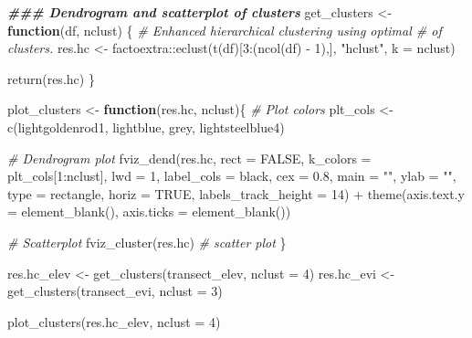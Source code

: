\documentclass[
]{article}
\newenvironment{Shaded}{\begin{snugshade}}{\end{snugshade}}
\newcommand{\AttributeTok}[1]{\textcolor[rgb]{0.77,0.63,0.00}{#1}}
\newcommand{\CommentTok}[1]{\textcolor[rgb]{0.56,0.35,0.01}{\textit{#1}}}
\newcommand{\ConstantTok}[1]{\textcolor[rgb]{0.00,0.00,0.00}{#1}}
\newcommand{\ControlFlowTok}[1]{\textcolor[rgb]{0.13,0.29,0.53}{\textbf{#1}}}
\newcommand{\DecValTok}[1]{\textcolor[rgb]{0.00,0.00,0.81}{#1}}
\newcommand{\DocumentationTok}[1]{\textcolor[rgb]{0.56,0.35,0.01}{\textbf{\textit{#1}}}}
\newcommand{\FloatTok}[1]{\textcolor[rgb]{0.00,0.00,0.81}{#1}}
\newcommand{\FunctionTok}[1]{\textcolor[rgb]{0.00,0.00,0.00}{#1}}
\newcommand{\NormalTok}[1]{#1}
\newcommand{\OtherTok}[1]{\textcolor[rgb]{0.56,0.35,0.01}{#1}}
\newcommand{\SpecialCharTok}[1]{\textcolor[rgb]{0.00,0.00,0.00}{#1}}
\newcommand{\StringTok}[1]{\textcolor[rgb]{0.31,0.60,0.02}{#1}}
\begin{document}
\begin{Shaded}
\begin{Highlighting}[]

\DocumentationTok{\#\#\# Dendrogram and scatterplot of clusters}
\NormalTok{get\_clusters }\OtherTok{\textless{}{-}} \ControlFlowTok{function}\NormalTok{(df, nclust) \{}
  \CommentTok{\# Enhanced hierarchical clustering using optimal \# of clusters.}
\NormalTok{  res.hc }\OtherTok{\textless{}{-}}\NormalTok{ factoextra}\SpecialCharTok{::}\FunctionTok{eclust}\NormalTok{(}\FunctionTok{t}\NormalTok{(df)[}\DecValTok{3}\SpecialCharTok{:}\NormalTok{(}\FunctionTok{ncol}\NormalTok{(df) }\SpecialCharTok{{-}} \DecValTok{1}\NormalTok{),], }
                                 \StringTok{"hclust"}\NormalTok{, }\AttributeTok{k =}\NormalTok{ nclust)}
  
  \FunctionTok{return}\NormalTok{(res.hc)}
\NormalTok{\}}

\NormalTok{plot\_clusters }\OtherTok{\textless{}{-}} \ControlFlowTok{function}\NormalTok{(res.hc, nclust)\{}
  \CommentTok{\# Plot colors}
\NormalTok{  plt\_cols }\OtherTok{\textless{}{-}} \FunctionTok{c}\NormalTok{(}\StringTok{\textquotesingle{}lightgoldenrod1\textquotesingle{}}\NormalTok{, }\StringTok{\textquotesingle{}lightblue\textquotesingle{}}\NormalTok{, }\StringTok{\textquotesingle{}grey\textquotesingle{}}\NormalTok{, }\StringTok{\textquotesingle{}lightsteelblue4\textquotesingle{}}\NormalTok{)}
  
  \CommentTok{\# Dendrogram plot}
  \FunctionTok{fviz\_dend}\NormalTok{(res.hc, }\AttributeTok{rect =} \ConstantTok{FALSE}\NormalTok{, }\AttributeTok{k\_colors =}\NormalTok{ plt\_cols[}\DecValTok{1}\SpecialCharTok{:}\NormalTok{nclust], }
            \AttributeTok{lwd =} \DecValTok{1}\NormalTok{, }\AttributeTok{label\_cols =} \StringTok{\textquotesingle{}black\textquotesingle{}}\NormalTok{, }\AttributeTok{cex =} \FloatTok{0.8}\NormalTok{, }\AttributeTok{main =} \StringTok{""}\NormalTok{, }\AttributeTok{ylab =} \StringTok{""}\NormalTok{, }
            \AttributeTok{type =} \StringTok{\textquotesingle{}rectangle\textquotesingle{}}\NormalTok{, }\AttributeTok{horiz =} \ConstantTok{TRUE}\NormalTok{, }\AttributeTok{labels\_track\_height =} \DecValTok{14}\NormalTok{) }\SpecialCharTok{+} 
    \FunctionTok{theme}\NormalTok{(}\AttributeTok{axis.text.y =} \FunctionTok{element\_blank}\NormalTok{(), }\AttributeTok{axis.ticks =} \FunctionTok{element\_blank}\NormalTok{())}
  
  \CommentTok{\# Scatterplot}
  \FunctionTok{fviz\_cluster}\NormalTok{(res.hc) }\CommentTok{\# scatter plot}
\NormalTok{\}}

\NormalTok{res.hc\_elev }\OtherTok{\textless{}{-}} \FunctionTok{get\_clusters}\NormalTok{(transect\_elev, }\AttributeTok{nclust =} \DecValTok{4}\NormalTok{)}
\NormalTok{res.hc\_evi }\OtherTok{\textless{}{-}} \FunctionTok{get\_clusters}\NormalTok{(transect\_evi, }\AttributeTok{nclust =} \DecValTok{3}\NormalTok{)}

\FunctionTok{plot\_clusters}\NormalTok{(res.hc\_elev, }\AttributeTok{nclust =} \DecValTok{4}\NormalTok{)}
\end{Highlighting}
\end{Shaded}
\end{document}
